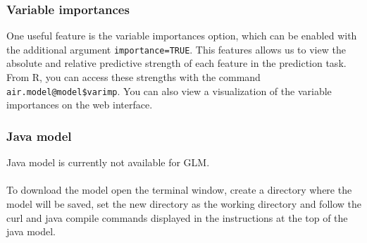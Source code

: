 \documentclass[11pt]{article}
\begin{document}
\subsubsection{Variable importances} \label{3.3.1}
One useful feature is the variable importances option, which can be enabled with the additional argument \texttt{importance=TRUE}. This features allows us to view the absolute and relative predictive strength of each feature in the prediction task. From R, you can access these strengths with the command \texttt{air.model@model\$varimp}. You can also view a visualization of the variable
importances on the web interface.
\subsubsection{Java model} 
Java model is currently not available for GLM.
\\
\\
To download the model open the terminal window, create a directory where the model will be saved, set the new directory as the working directory and follow the curl and java compile commands displayed in the instructions at the top of the java model.

\newpage
\end{document}
